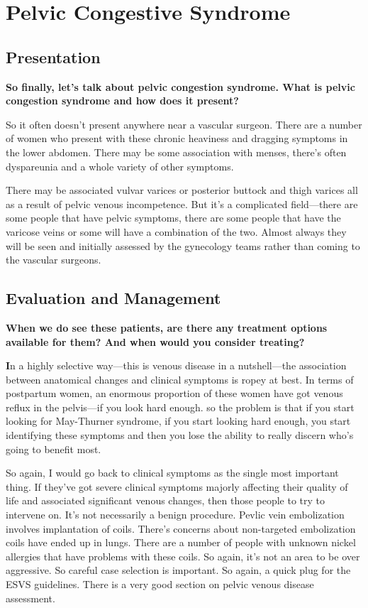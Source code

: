 \documentclass[
]{book}
\begin{document}
\hypertarget{pelvic-congestive-syndrome}{%
\section{Pelvic Congestive Syndrome}\label{pelvic-congestive-syndrome}}

\hypertarget{presentation-12}{%
\subsection{Presentation}\label{presentation-12}}

\textbf{So finally, let's talk about pelvic congestion syndrome. What is
pelvic congestion syndrome and how does it present?}

So it often doesn't present anywhere near a vascular surgeon. There are
a number of women who present with these chronic heaviness and dragging
symptoms in the lower abdomen. There may be some association with
menses, there's often dyspareunia and a whole variety of other symptoms.

There may be associated vulvar varices or posterior buttock and thigh
varices all as a result of pelvic venous incompetence. But it's a
complicated field---there are some people that have pelvic symptoms,
there are some people that have the varicose veins or some will have a
combination of the two. Almost always they will be seen and initially
assessed by the gynecology teams rather than coming to the vascular
surgeons.

\hypertarget{evaluation-and-management}{%
\subsection{Evaluation and Management}\label{evaluation-and-management}}

\textbf{When we do see these patients, are there any treatment options
available for them? And when would you consider treating?}

\textbf{I}n a highly selective way---this is venous disease in a
nutshell---the association between anatomical changes and clinical
symptoms is ropey at best. In terms of postpartum women, an enormous
proportion of these women have got venous reflux in the pelvis---if you
look hard enough. so the problem is that if you start looking for
May-Thurner syndrome, if you start looking hard enough, you start
identifying these symptoms and then you lose the ability to really
discern who's going to benefit most.

So again, I would go back to clinical symptoms as the single most
important thing. If they've got severe clinical symptoms majorly
affecting their quality of life and associated significant venous
changes, then those people to try to intervene on. It's not necessarily
a benign procedure. Pevlic vein embolization involves implantation of
coils. There's concerns about non-targeted embolization coils have ended
up in lungs. There are a number of people with unknown nickel allergies
that have problems with these coils. So again, it's not an area to be
over aggressive. So careful case selection is important. So again, a
quick plug for the ESVS guidelines. There is a very good section on
pelvic venous disease assessment.\citep{demaeseneer2022}
\end{document}
